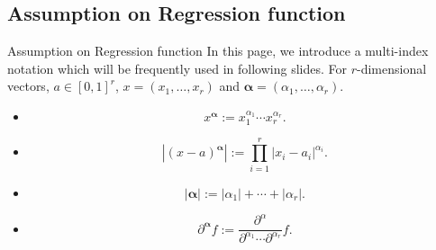 \documentclass{if-beamer}
\begin{document}
\subsection{Assumption on Regression function}
\begin{frame}{Assumption on Regression function}
In this page, we introduce a multi-index notation which will be frequently used in following slides. For $r$-dimensional vectors, $a\in[0,1]^{r}$, $x=(x_{1},\dots,x_{r})$ and $\boldsymbol{\alpha}=(\alpha_{1},\dots,\alpha_{r})$.
\begin{itemize}
    \item 
    \begin{equation*}
        x^{\boldsymbol{\alpha}} := x_{1}^{\alpha_{1}}\cdots x_{r}^{\alpha_{r}}.
    \end{equation*}
    
    \item 
    \begin{equation*}
        \left| (x-a)^{\boldsymbol{\alpha}} \right| := \prod_{i=1}^{r} \left| x_{i} - a_{i} \right|^{\alpha_{i}}.
    \end{equation*}
    
    \item 
    \begin{equation*}
        |\boldsymbol{\alpha}| := |\alpha_{1}|+\cdots+|\alpha_{r}|.
    \end{equation*}
    
    \item 
    \begin{equation*}
        \partial^{\boldsymbol{\alpha}}{f} := 
        \frac{\partial^{\alpha}}{\partial^{\alpha_{1}}\cdots\partial^{\alpha_{r}}}f.
    \end{equation*}
\end{itemize}
\end{frame}
\end{document}
